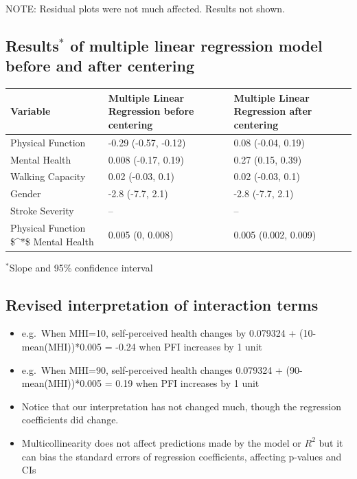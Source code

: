 \documentclass[
]{book}
\providecommand{\tightlist}{%
  \setlength{\itemsep}{0pt}\setlength{\parskip}{0pt}}
\begin{document}
NOTE: Residual plots were not much affected. Results not shown.

\hypertarget{results-of-multiple-linear-regression-model-before-and-after-centering}{%
\subsection{\texorpdfstring{Results\(^*\) of multiple linear regression model before and after centering}{Results\^{}* of multiple linear regression model before and after centering}}\label{results-of-multiple-linear-regression-model-before-and-after-centering}}

\begin{tabular}{l|l|l}
\hline
Variable & Multiple Linear Regression before centering & Multiple Linear Regression after centering\\
\hline
Physical Function & -0.29 (-0.57, -0.12) & 0.08 (-0.04, 0.19)\\
\hline
Mental Health & 0.008 (-0.17, 0.19) & 0.27 (0.15, 0.39)\\
\hline
Walking Capacity & 0.02 (-0.03, 0.1) & 0.02 (-0.03, 0.1)\\
\hline
Gender & -2.8 (-7.7, 2.1) & -2.8 (-7.7, 2.1)\\
\hline
Stroke Severity & -- & --\\
\hline
Physical Function \$\textasciicircum{}*\$ Mental Health & 0.005 (0, 0.008) & 0.005 (0.002, 0.009)\\
\hline
\end{tabular}

\(^*\)Slope and 95\% confidence interval

\hypertarget{revised-interpretation-of-interaction-terms}{%
\subsection{Revised interpretation of interaction terms}\label{revised-interpretation-of-interaction-terms}}

\begin{itemize}
\tightlist
\item
  e.g.~When MHI=10, self-perceived health changes by 0.079324 + (10-mean(MHI))*0.005 = -0.24 when PFI increases by 1 unit
\item
  e.g.~When MHI=90, self-perceived health changes 0.079324 + (90-mean(MHI))*0.005 = 0.19 when PFI increases by 1 unit
\item
  Notice that our interpretation has not changed much, though the regression coefficients did change.
\item
  Multicollinearity does not affect predictions made by the model or \(R^2\) but it can bias the standard errors of regression coefficients, affecting p-values and CIs
\end{itemize}
\end{document}
